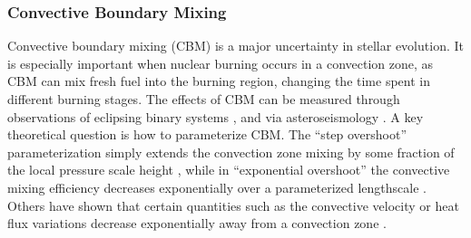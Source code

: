 \subsubsection{Convective Boundary Mixing}

Convective boundary mixing (CBM) is a major uncertainty in stellar evolution. It is especially important when nuclear burning occurs in a convection zone, as CBM can mix fresh fuel into the burning region, changing the time spent in different burning stages. The effects of CBM can be measured through observations of eclipsing binary systems \citep[e.g.,][]{Stancliffe_2015,claret:16,Valle_2016}, and via asteroseismology \citep[e.g.,][]{Constantino:2015,deheuvels:16,Ghasemi_2016}. A key theoretical question is how to parameterize CBM. The ``step overshoot'' parameterization simply extends the convection zone mixing by some fraction of the local pressure scale height \citep[e.g.,][]{Shaviv_1973}, while in ``exponential overshoot'' the convective mixing efficiency decreases exponentially over a parameterized lengthscale \citep{Freytag1996}. Others have shown that certain quantities such as the convective velocity or heat flux variations decrease exponentially away from a convection zone \citep{Pratt_2017}.